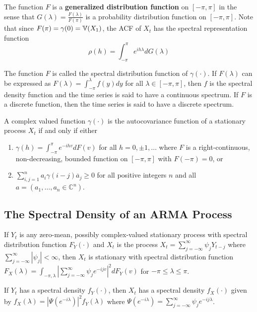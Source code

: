 \begin{remark}
  The function $F$ is a \textbf{generalized distribution function} on
  $[-\pi, \pi]$ in the sense that $G(\lambda) =
  \frac{F(\lambda)}{F(\pi)}$ is a probability distribution function on
  $[-\pi, \pi]$. Note that since $F(\pi) = \gamma(0) = \Var{X_{1}}$,
  the ACF of $X_{t}$ has the spectral representation function
  \begin{equation}
    \label{eq:73}
    \rho(h) = \int_{-\pi}^{\pi} e^{ih \lambda} dG(\lambda)
  \end{equation}

  The function $F$ is called the spectral distribution function of
  $\gamma(\cdot)$. If $F(\lambda)$ can be expressed as $F(\lambda) =
  \int_{-\pi}^{\lambda} f(y) dy$ for all $\lambda \in [-\pi, \pi]$,
  then $f$ is the spectral density function and the time series is
  said to have a continuous spectrum. If $F$ is a discrete function,
  then the time series is said to have a discrete spectrum.
\end{remark}

\begin{thm}
  \label{sec:spectral-analysis-1}
  A complex valued function $\gamma(\cdot)$ is the autocovariance
  function of a stationary process $X_{t}$ if and only if either
  \begin{enumerate}
  \item $\gamma(h) = \int_{-\pi}^{\pi} e^{-ihv} dF(v) $ for all $h =
    0, \pm 1, \dots$ where $F$ is a right-continuous, non-decreasing,
    bounded function on $[-\pi, \pi]$ with $F(-\pi) = 0$, or
  \item $\sum_{i, j =1}^{n} a_{i} \gamma(i - j) \overline a_{j} \geq
    0$ for all positive integers $n$ and all $a = (a_{1}, \dots, a_{n}
    \in \mathbb{C}^{n})$.
  \end{enumerate}
\end{thm}

\subsection{The Spectral Density of an \textsc{ARMA} Process}
\label{sec:spectral-density-an}

\begin{thm}
  \label{sec:spectral-density-an-1}
  If $Y_{t}$ is any zero-mean, possibly complex-valued stationary
  process with spectral distribution function $F_{Y}(\cdot)$ and
  $X_{t}$ is the process $X_{t} = \sum_{j = -\infty}^{\infty} \psi_{j}
  Y_{t-j}$ where $\sum_{j=-\infty}^{\infty} |\psi_{j}| < \infty$, then
  $X_{t}$ is stationary with spectral distribution function
  $F_{X}(\lambda) = \int_{-\pi, \lambda} | \sum_{j=-\infty}^{\infty}
  \psi_{j} e^{-ijv}|^{2} dF_{Y}(v)$ for $-\pi \leq \lambda \leq \pi$.

  If $Y_{t}$ has a spectral density $f_{Y}(\cdot)$, then $X_{t}$ has a
  spectral density $f_{X}(\cdot)$ given by $f_{X}(\lambda) =
  |\Psi(e^{-i\lambda})|^{2} f_{Y}(\lambda)$ where $\Psi(e^{-i\lambda})
  = \sum_{j=-\infty}^{\infty} \psi_{j} e^{-ij\lambda}$.
\end{thm}

